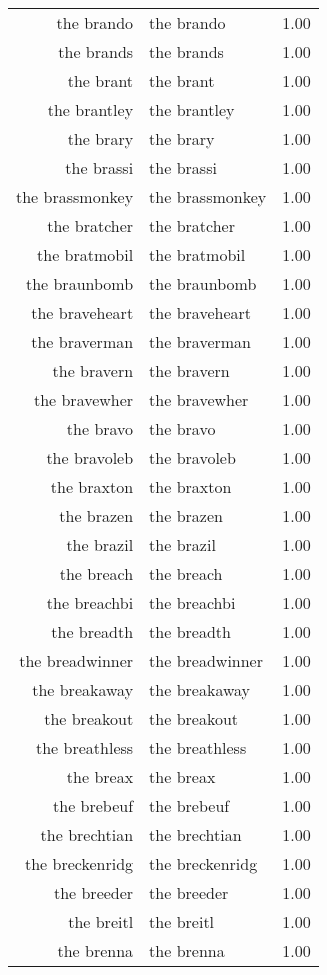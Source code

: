 \begin{table}[ht]
\begin{tabular}{rlr}
  the brando & the brando & 1.00 \\ 
  the brands & the brands & 1.00 \\ 
  the brant & the brant & 1.00 \\ 
  the brantley & the brantley & 1.00 \\ 
  the brary & the brary & 1.00 \\ 
  the brassi & the brassi & 1.00 \\ 
  the brassmonkey & the brassmonkey & 1.00 \\ 
  the bratcher & the bratcher & 1.00 \\ 
  the bratmobil & the bratmobil & 1.00 \\ 
  the braunbomb & the braunbomb & 1.00 \\ 
  the braveheart & the braveheart & 1.00 \\ 
  the braverman & the braverman & 1.00 \\ 
  the bravern & the bravern & 1.00 \\ 
  the bravewher & the bravewher & 1.00 \\ 
  the bravo & the bravo & 1.00 \\ 
  the bravoleb & the bravoleb & 1.00 \\ 
  the braxton & the braxton & 1.00 \\ 
  the brazen & the brazen & 1.00 \\ 
  the brazil & the brazil & 1.00 \\ 
  the breach & the breach & 1.00 \\ 
  the breachbi & the breachbi & 1.00 \\ 
  the breadth & the breadth & 1.00 \\ 
  the breadwinner & the breadwinner & 1.00 \\ 
  the breakaway & the breakaway & 1.00 \\ 
  the breakout & the breakout & 1.00 \\ 
  the breathless & the breathless & 1.00 \\ 
  the breax & the breax & 1.00 \\ 
  the brebeuf & the brebeuf & 1.00 \\ 
  the brechtian & the brechtian & 1.00 \\ 
  the breckenridg & the breckenridg & 1.00 \\ 
  the breeder & the breeder & 1.00 \\ 
  the breitl & the breitl & 1.00 \\ 
  the brenna & the brenna & 1.00 \\ 

\end{tabular}
\end{table}
